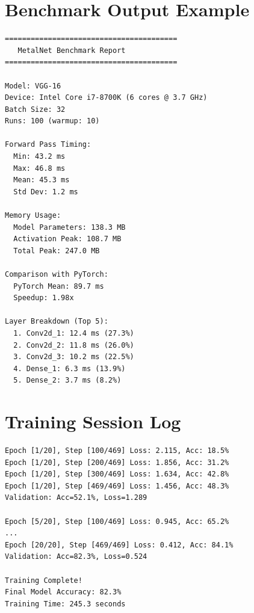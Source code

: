 \documentclass[12pt,oneside,a4paper]{report}
\begin{document}
\section{Benchmark Output Example}

\begin{lstlisting}
========================================
   MetalNet Benchmark Report
========================================

Model: VGG-16
Device: Intel Core i7-8700K (6 cores @ 3.7 GHz)
Batch Size: 32
Runs: 100 (warmup: 10)

Forward Pass Timing:
  Min: 43.2 ms
  Max: 46.8 ms
  Mean: 45.3 ms
  Std Dev: 1.2 ms

Memory Usage:
  Model Parameters: 138.3 MB
  Activation Peak: 108.7 MB
  Total Peak: 247.0 MB

Comparison with PyTorch:
  PyTorch Mean: 89.7 ms
  Speedup: 1.98x

Layer Breakdown (Top 5):
  1. Conv2d_1: 12.4 ms (27.3%)
  2. Conv2d_2: 11.8 ms (26.0%)
  3. Conv2d_3: 10.2 ms (22.5%)
  4. Dense_1: 6.3 ms (13.9%)
  5. Dense_2: 3.7 ms (8.2%)
\end{lstlisting}

\section{Training Session Log}

\begin{lstlisting}
Epoch [1/20], Step [100/469] Loss: 2.115, Acc: 18.5%
Epoch [1/20], Step [200/469] Loss: 1.856, Acc: 31.2%
Epoch [1/20], Step [300/469] Loss: 1.634, Acc: 42.8%
Epoch [1/20], Step [469/469] Loss: 1.456, Acc: 48.3%
Validation: Acc=52.1%, Loss=1.289

Epoch [5/20], Step [100/469] Loss: 0.945, Acc: 65.2%
...
Epoch [20/20], Step [469/469] Loss: 0.412, Acc: 84.1%
Validation: Acc=82.3%, Loss=0.524

Training Complete!
Final Model Accuracy: 82.3%
Training Time: 245.3 seconds
\end{lstlisting}
\end{document}
